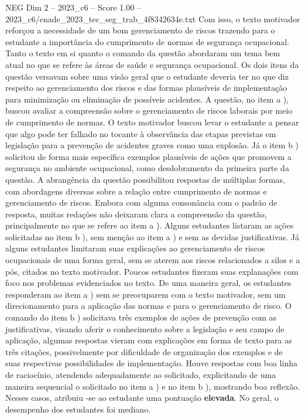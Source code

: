 \begin{textsample}{NEG Dim 2 – 2023\_c6 – Score 1.00 – 2023\_c6/enade\_2023\_tec\_seg\_trab\_4f8342634e.txt}
Com isso, o texto motivador reforçou a necessidade de um bom gerenciamento de riscos trazendo para o estudante a importância do cumprimento de normas de segurança ocupacional.
Tanto o texto em si quanto o comando da questão abordaram um tema bem atual no que se refere às áreas de saúde e segurança ocupacional.
Os dois itens da questão versavam sobre uma visão geral que o estudante deveria ter no que diz respeito ao gerenciamento dos riscos e das formas plausíveis de implementação para minimização ou eliminação de possíveis acidentes.
A questão, no item a ), buscou avaliar a compreensão sobre o gerenciamento de riscos laborais por meio de cumprimento de normas.
O texto motivador buscou levar o estudante a pensar que algo pode ter falhado no tocante à observância das etapas previstas em legislação para a prevenção de acidentes graves como uma explosão.
Já o item b ) solicitou de forma mais específica exemplos plausíveis de ações que promovem a segurança no ambiente ocupacional, como desdobramento da primeira parte da questão.
A abrangência da questão possibilitou respostas de múltiplas formas, com abordagens diversas sobre a relação entre cumprimento de normas e gerenciamento de riscos.
Embora com alguma consonância com o padrão de resposta, muitas redações não deixaram clara a compreensão da questão, principalmente no que se refere ao item a ).
Alguns estudantes listaram as ações solicitadas no item b ), sem menção ao item a ) e sem as devidas justificativas.
Já alguns estudantes limitaram suas explicações ao gerenciamento de riscos ocupacionais de uma forma geral, sem se aterem aos riscos relacionados a silos e a pós, citados no texto motivador.
Poucos estudantes fizeram suas explanações com foco nos problemas evidenciados no texto.
De uma maneira geral, os estudantes responderam ao item a ) sem se preocuparem com o texto motivador, sem um direcionamento para a aplicação das normas e para o gerenciamento de risco.
O comando do item b ) solicitava três exemplos de ações de prevenção com as justificativas, visando aferir o conhecimento sobre a legislação e seu campo de aplicação, algumas respostas vieram com explicações em forma de texto para as três citações, possivelmente por dificuldade de organização dos exemplos e de suas respectivas possibilidades de implementação.
Houve respostas com boa linha de raciocínio, atendendo adequadamente ao solicitado, explicitando de uma maneira sequencial o solicitado no item a ) e no item b ), mostrando boa reflexão.
Nesses casos, atribuiu -se ao estudante uma pontuação \textbf{elevada}.
No geral, o desempenho dos estudantes foi mediano.

\end{textsample}
